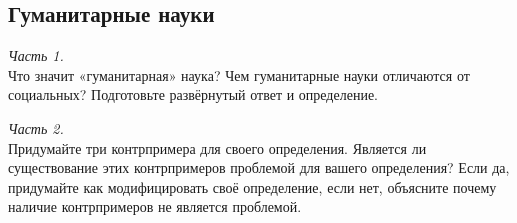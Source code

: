 \documentclass[a4paper, 12pt]{article}
\begin{document}
 \subsection*{Гуманитарные науки}
 \textit{Часть 1.}\\
 Что значит «гуманитарная» наука? Чем гуманитарные науки отличаются от социальных? Подготовьте развёрнутый ответ и определение.
 
 \noindent\textit{Часть 2.} \\
 Придумайте три контрпримера для своего определения. Является ли существование этих контрпримеров проблемой для вашего определения? Если да, придумайте как модифицировать своё определение, если нет, объясните почему наличие контрпримеров не является проблемой.
\end{document}
